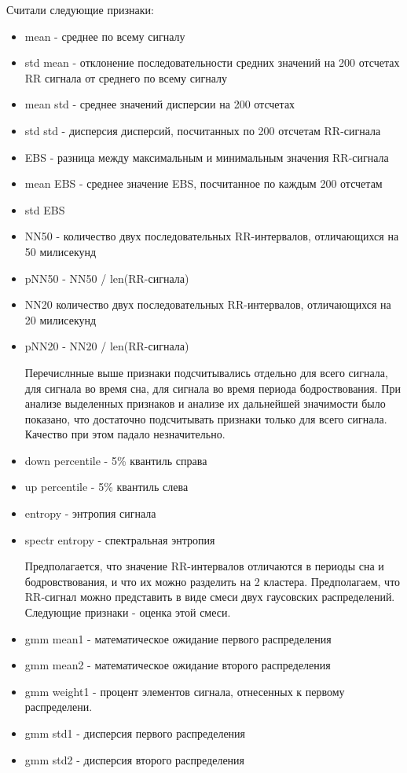 Считали следующие признаки:
\begin{itemize}
	\item mean - среднее по всему сигналу
	\item std mean - отклонение последовательности средних значений на 200 отсчетах RR сигнала от среднего по всему сигналу
	\item mean std - среднее значений дисперсии на 200 отсчетах
	\item std std - дисперсия дисперсий, посчитанных по 200 отсчетам RR-сигнала
	\item EBS - разница между максимальным и минимальным значения RR-сигнала
	\item mean EBS - среднее значение EBS, посчитанное по каждым 200 отсчетам
	\item std EBS
	\item NN50 - количество двух последовательных RR-интервалов, отличающихся на 50 милисекунд
	\item pNN50 - NN50 / len(RR-сигнала)
	\item NN20 количество двух последовательных RR-интервалов, отличающихся на 20 милисекунд
	\item pNN20 - NN20 / len(RR-сигнала)
	
	Перечислнные выше признаки подсчитывались отдельно для всего сигнала, для сигнала во время сна, для сигнала во время периода бодроствования. При анализе выделенных признаков и анализе их дальнейшей значимости было показано, что достаточно подсчитывать признаки только для всего сигнала. Качество при этом падало незначительно.
	
	\item down percentile - 5\% квантиль справа
	\item up percentile - 5\% квантиль слева
	\item entropy - энтропия сигнала
	\item spectr entropy - спектральная энтропия
	
	Предполагается, что значение RR-интервалов отличаются в периоды сна и бодровствования, и что их можно разделить на 2 кластера. Предполагаем, что RR-сигнал можно представить в виде смеси двух гаусовских распределений. Следующие признаки - оценка этой смеси. 
	
	\item gmm mean1 - математическое ожидание первого распределения
	\item gmm mean2 - математическое ожидание второго распределения
	\item gmm weight1 - процент элементов сигнала, отнесенных к первому распределени.
	\item gmm std1 - дисперсия первого распределения
	\item gmm std2 - дисперсия второго распределения
	

\end{itemize}
